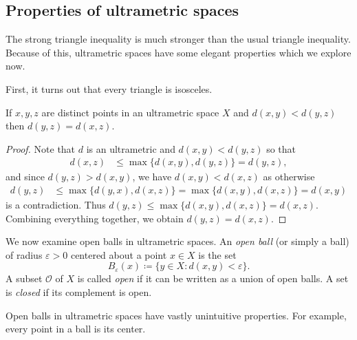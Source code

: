 \subsection{Properties of ultrametric spaces} The strong triangle inequality is much stronger than the usual triangle inequality. Because of this, ultrametric spaces have some elegant properties which we explore now.

First, it turns out that every triangle is isosceles.
\begin{lemma}
\label{lem:1}
If \( x, y, z \) are distinct points in an ultrametric space \( X \) and \( d(x,y) < d(y,z) \) then \( d(y,z) = d(x,z) \).
\end{lemma}
\begin{proof}
Note that \( d \) is an ultrametric and \( d(x,y) < d(y,z) \) so that
\begin{align*}
	d(x, z) &\leq \max \{ d(x,y), d(y, z) \} = d(y,z),
\end{align*}
and since \( d(y,z) > d(x,y) \), we have \( d(x,y) < d(x,z) \) as otherwise
\begin{align*}
	d(y,z) &\leq \max \{ d(y, x) , d(x, z) \} = \max \{ d(x,y) , d(x,z) \} = d(x,y)
\end{align*}
is a contradiction. Thus \( d(y,z) \leq \max \{ d(x,y), d(x,z) \} = d(x,z) \). Combining everything together, we obtain \( d(y,z) = d(x,z) \).
\end{proof}

We now examine open balls in ultrametric spaces. An \emph{open ball} (or simply a ball) of radius \( \varepsilon > 0 \) centered about a point \( x \in  X \) is the set \[ B_{\varepsilon }(x) \coloneqq \{ y \in X : d(x,y) < \varepsilon  \}.  \] A subset \( \mathcal{O}  \) of \( X \) is called \emph{open} if it can be written as a union of open balls. A set is \emph{closed} if its complement is open.

Open balls in ultrametric spaces have vastly unintuitive properties. For example, every point in a ball is its center.

